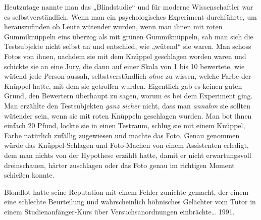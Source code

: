Heutzutage nannte man das „Blindstudie“ und für moderne Wissenschaftler war es selbstverständlich. Wenn man ein psychologisches Experiment durchführte, um herauszufinden ob Leute wütender wurden, wenn man ihnen mit roten Gummiknüppeln eins überzog als mit grünen Gummiknüppeln, sah man sich die Testsubjekte nicht selbst an und entschied, wie „wütend“ sie waren. Man schoss Fotos von ihnen, nachdem sie mit dem Knüppel geschlagen worden waren und schickte sie an eine Jury, die dann auf einer Skala von 1 bis 10 bewertete, wie wütend jede Person aussah, selbstverständlich \emph{ohne} zu wissen, welche Farbe der Knüppel hatte, mit dem sie getroffen wurden. Eigentlich gab es keinen guten Grund, den Bewertern überhaupt zu sagen, worum es bei dem Experiment ging. Man erzählte den Testsubjekten \emph{ganz sicher} nicht, dass man \emph{annahm} sie sollten wütender sein, wenn sie mit roten Knüppeln geschlagen wurden. Man bot ihnen einfach 20 Pfund, lockte sie in einen Testraum, schlug sie mit einem Knüppel, Farbe natürlich zufällig zugewiesen und machte das Foto. Genau genommen würde das Knüppel-Schlagen und Foto-Machen von einem Assistenten erledigt, dem man nichts von der Hypothese erzählt hatte, damit er nicht erwartungsvoll dreinschauen, härter zuschlagen oder das Foto genau im richtigen Moment schießen konnte.

Blondlot hatte seine Reputation mit einem Fehler zunichte gemacht, der einem eine schlechte Beurteilung und wahrscheinlich höhnisches Gelächter vom Tutor in einem Studienanfänger-Kurs über Versuchsanordnungen einbrächte… 1991.

